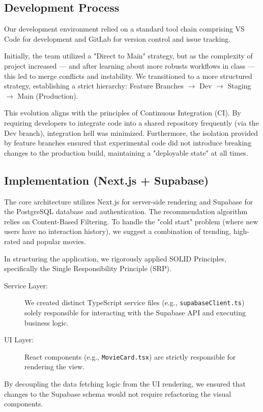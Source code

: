 \documentclass[a4paper,12pt]{report}
\begin{document}
\subsection{Development Process}
Our development environment relied on a standard tool chain comprising VS Code for development and GitLab for version control and issue tracking.

Initially, the team utilized a "Direct to Main" strategy, but as the complexity of project increased --- and after learning about more robusts workflows in class --- this led to merge conflicts and instability. We transitioned to a more structured strategy, establishing a strict hierarchy: Feature Branches $\rightarrow$ Dev $\rightarrow$ Staging $\rightarrow$ Main (Production).

This evolution aligns with the principles of Continuous Integration (CI). By requiring developers to integrate code into a shared repository frequently (via the Dev branch), integration hell was minimized. Furthermore, the isolation provided by feature branches ensured that experimental code did not introduce breaking changes to the production build, maintaining a "deployable state" at all times.

\subsection{Implementation (Next.js + Supabase)}
The core architecture utilizes Next.js for server-side rendering and Supabase for the PostgreSQL database and authentication. The recommendation algorithm relies on Content-Based Filtering. To handle the "cold start" problem (where new users have no interaction history), we suggest a combination of trending, high-rated and popular movies.

In structuring the application, we rigorously applied SOLID Principles, specifically the Single Responsibility Principle (SRP).

\begin{description}
    \item[Service Layer:] We created distinct TypeScript service files (e.g., \texttt{supabaseClient.ts}) solely responsible for interacting with the Supabase API and executing business logic.
    
    \item[UI Layer:] React components (e.g., \texttt{MovieCard.tsx}) are strictly responsible for rendering the view.
\end{description}

By decoupling the data fetching logic from the UI rendering, we ensured that changes to the Supabase schema would not require refactoring the visual components.
\end{document}
